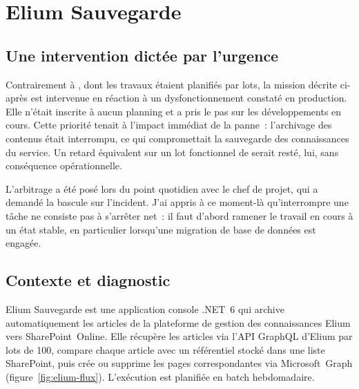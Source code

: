 \section{Elium Sauvegarde}
\label{sec:elium}

\subsection{Une intervention dictée par l'urgence}
\label{sec:urgence}

Contrairement à \csbag, dont les travaux étaient planifiés par lots, la mission
décrite ci-après est intervenue en réaction à un dysfonctionnement constaté en
production. Elle n'était inscrite à aucun planning et a pris le pas sur les
développements en cours. Cette priorité tenait à l'impact immédiat de la
panne~: l'archivage des contenus était interrompu, ce qui compromettait la
sauvegarde des connaissances du service. Un retard équivalent sur un lot
fonctionnel de \csbag serait resté, lui, sans conséquence opérationnelle.

L'arbitrage a été posé lors du point quotidien avec le chef de projet, qui a
demandé la bascule sur l'incident. J'ai appris à ce moment-là qu'interrompre une
tâche ne consiste pas à s'arrêter net~: il faut d'abord ramener le travail en
cours à un état stable, en particulier lorsqu'une migration de base de données
est engagée.

\subsection{Contexte et diagnostic}
\label{sec:elium-contexte}

Elium Sauvegarde est une application console .NET~6 qui archive automatiquement
les articles de la plateforme de gestion des connaissances Elium vers
SharePoint~Online. Elle récupère les articles via l'API GraphQL d'Elium par lots
de 100, compare chaque article avec un référentiel stocké dans une liste
SharePoint, puis crée ou supprime les pages correspondantes via Microsoft~Graph
(figure~\ref{fig:elium-flux}). L'exécution est planifiée en batch hebdomadaire.

